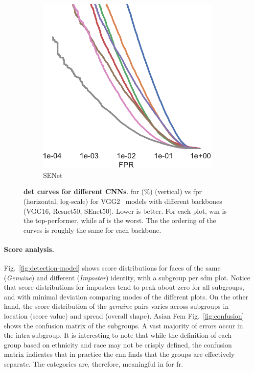 \begin{figure}[h!]
\begin{subfigure}[t]{.27\linewidth}
    \includegraphics[width=.75\linewidth]{figures/curve_senet50_subgroups-crop.pdf}
    \caption{SENet~\cite{hu2018squeeze}}
    \end{subfigure}
    \caption{\small{\textbf{\gls{det} curves for different CNNs}. \gls{fnr} (\%) (vertical) vs \gls{fpr}  (horizontal, log-scale) for VGG2~\cite{Cao18} models with different backbones (VGG16, Resnet50, SEnet50). Lower is better. For each plot, \gls{wm} is the top-performer, while \gls{af} is the worst. The the ordering of the curves is roughly the same for each backbone.}}\label{fig:sdm-appendix-a}
\end{figure}
\noindent\paragraph{Score analysis.}
Fig.~\ref{fig:detection-model} shows score distributions for faces of the same (\ie \emph{Genuine}) and different (\ie \emph{Imposter}) identity, with a subgroup per \gls{sdm} plot. Notice that score distributions for imposters tend to peak about zero for all subgroups, and with minimal deviation comparing modes of the different plots. On the other hand, the score distribution of the \emph{genuine} pairs varies across subgroups in location (\ie score value) and spread (\ie overall shape). Asian Fem
Fig.~\ref{fig:confusion} shows the confusion matrix of the subgroups. A vast majority of errors occur in the intra-subgroup. It is interesting to note that while the definition of  each group  based on ethnicity and race may not be crisply defined, the confusion matrix indicates that in practice the \gls{cnn} finds that the groups are effectively separate. The categories are, therefore, meaningful in for \gls{fr}.








